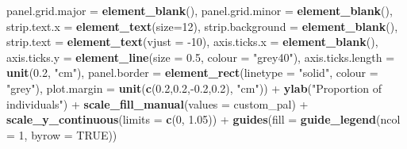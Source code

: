 \documentclass[]{article}
\newenvironment{Shaded}{\begin{snugshade}}{\end{snugshade}}
\newcommand{\KeywordTok}[1]{\textcolor[rgb]{0.13,0.29,0.53}{\textbf{{#1}}}}
\newcommand{\DataTypeTok}[1]{\textcolor[rgb]{0.13,0.29,0.53}{{#1}}}
\newcommand{\DecValTok}[1]{\textcolor[rgb]{0.00,0.00,0.81}{{#1}}}
\newcommand{\FloatTok}[1]{\textcolor[rgb]{0.00,0.00,0.81}{{#1}}}
\newcommand{\StringTok}[1]{\textcolor[rgb]{0.31,0.60,0.02}{{#1}}}
\newcommand{\OtherTok}[1]{\textcolor[rgb]{0.56,0.35,0.01}{{#1}}}
\newcommand{\NormalTok}[1]{{#1}}
\begin{document}
\begin{Shaded}
\begin{Highlighting}[]
                \DataTypeTok{panel.grid.major =} \KeywordTok{element_blank}\NormalTok{(),}
                \DataTypeTok{panel.grid.minor =} \KeywordTok{element_blank}\NormalTok{(),}
                \DataTypeTok{strip.text.x =} \KeywordTok{element_text}\NormalTok{(}\DataTypeTok{size=}\DecValTok{12}\NormalTok{),}
                \DataTypeTok{strip.background =} \KeywordTok{element_blank}\NormalTok{(),}
                \DataTypeTok{strip.text =} \KeywordTok{element_text}\NormalTok{(}\DataTypeTok{vjust =} \NormalTok{-}\DecValTok{10}\NormalTok{),}
                \DataTypeTok{axis.ticks.x =} \KeywordTok{element_blank}\NormalTok{(),}
                \DataTypeTok{axis.ticks.y =} \KeywordTok{element_line}\NormalTok{(}\DataTypeTok{size =} \FloatTok{0.5}\NormalTok{, }\DataTypeTok{colour =} \StringTok{"grey40"}\NormalTok{),}
                \DataTypeTok{axis.ticks.length =} \KeywordTok{unit}\NormalTok{(}\FloatTok{0.2}\NormalTok{, }\StringTok{"cm"}\NormalTok{),}
                \DataTypeTok{panel.border =} \KeywordTok{element_rect}\NormalTok{(}\DataTypeTok{linetype =} \StringTok{"solid"}\NormalTok{, }\DataTypeTok{colour =} \StringTok{"grey"}\NormalTok{),}
                \DataTypeTok{plot.margin =} \KeywordTok{unit}\NormalTok{(}\KeywordTok{c}\NormalTok{(}\FloatTok{0.2}\NormalTok{,}\FloatTok{0.2}\NormalTok{,-}\FloatTok{0.2}\NormalTok{,}\FloatTok{0.2}\NormalTok{), }\StringTok{"cm"}\NormalTok{)) +}
\StringTok{          }\KeywordTok{ylab}\NormalTok{(}\StringTok{"Proportion of individuals"}\NormalTok{) +}
\StringTok{          }\KeywordTok{scale_fill_manual}\NormalTok{(}\DataTypeTok{values =} \NormalTok{custom_pal) +}
\StringTok{          }\KeywordTok{scale_y_continuous}\NormalTok{(}\DataTypeTok{limits =} \KeywordTok{c}\NormalTok{(}\DecValTok{0}\NormalTok{, }\FloatTok{1.05}\NormalTok{)) +}
\StringTok{          }\KeywordTok{guides}\NormalTok{(}\DataTypeTok{fill =} \KeywordTok{guide_legend}\NormalTok{(}\DataTypeTok{ncol =} \DecValTok{1}\NormalTok{, }\DataTypeTok{byrow =} \OtherTok{TRUE}\NormalTok{))}
\end{Highlighting}
\end{Shaded}
\end{document}
